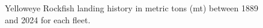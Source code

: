 \documentclass[
]{scrartcl}
\begin{document}
\begin{figure}


\caption{\label{fig-es-landings}Yelloweye Rockfish landing history in
metric tons (mt) between 1889 and 2024 for each fleet.}

\end{figure}%

\clearpage
\end{document}
